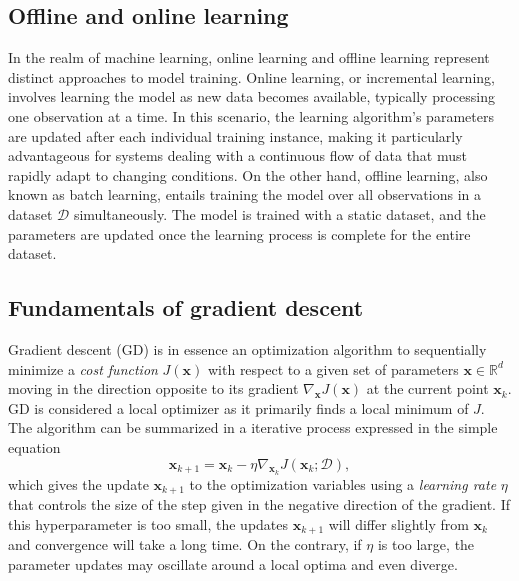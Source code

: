\subsection{Offline and online learning}
In the realm of machine learning, online learning and offline learning represent distinct approaches to model training. Online learning, or incremental learning, involves learning the model as new data becomes available, typically processing one observation at a time. In this scenario, the learning algorithm's parameters are updated after each individual training instance, making it particularly advantageous for systems dealing with a continuous flow of data that must rapidly adapt to changing conditions. On the other hand, offline learning, also known as batch learning, entails training the model over all observations in a dataset $\mathcal{D}$ simultaneously. The model is trained with a static dataset, and the parameters are updated once the learning process is complete for the entire dataset. %


\subsection{Fundamentals of gradient descent}
Gradient descent (GD) is in essence an optimization algorithm to sequentially minimize a \emph{cost function} $J(\bm{x})$ with respect to a given set of parameters $\bm{x} \in \mathbb{R}^d$ moving in the direction opposite to its gradient $\nabla_{\bm{x}}J(\bm{x})$ at the current point $\bm{x}_k$. GD is considered a local optimizer as it primarily finds a local minimum of $J$. The algorithm can be summarized in a iterative process expressed in the simple equation
\begin{equation}\label{eq:gradient_descent}
	\bm{x}_{k+1} = \bm{x}_k - \eta  \nabla_{\bm{x}_k} J(\bm{x}_k;\mathcal{D}),
\end{equation}  
which gives the update $\bm{x}_{k+1}$ to the optimization variables using a \emph{learning rate} $\eta$ that controls the size of the step given in the negative direction of the gradient. If this hyperparameter is too small, the updates $\bm{x}_{k+1}$ will differ slightly from $\bm{x}_k$ and convergence will take a long time. On the contrary, if $\eta$ is too large, the parameter updates may oscillate around a local optima and even diverge. 

